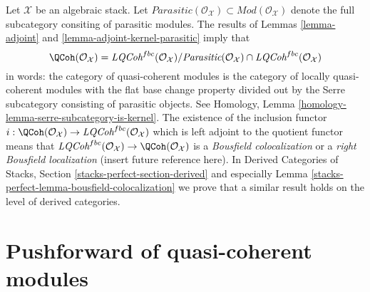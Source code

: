 \begin{remark}
\label{remark-bousfield-colocalization}
Let $\mathcal{X}$ be an algebraic stack. Let
$\textit{Parasitic}(\mathcal{O}_\mathcal{X}) \subset
\textit{Mod}(\mathcal{O}_\mathcal{X})$ denote the
full subcategory consiting of parasitic modules. The results of
Lemmas \ref{lemma-adjoint} and \ref{lemma-adjoint-kernel-parasitic}
imply that
$$
\QCoh(\mathcal{O}_\mathcal{X}) =
\textit{LQCoh}^{fbc}(\mathcal{O}_\mathcal{X}) /
\textit{Parasitic}(\mathcal{O}_\mathcal{X})
\cap \textit{LQCoh}^{fbc}(\mathcal{O}_\mathcal{X})
$$
in words: the category of quasi-coherent modules is the category
of locally quasi-coherent modules with the flat base change property
divided out by the Serre subcategory consisting of parasitic objects.
See Homology, Lemma \ref{homology-lemma-serre-subcategory-is-kernel}.
The existence of the inclusion functor
$i : \QCoh(\mathcal{O}_\mathcal{X}) \to
\textit{LQCoh}^{fbc}(\mathcal{O}_\mathcal{X})$
which is left adjoint to the quotient functor means that
$\textit{LQCoh}^{fbc}(\mathcal{O}_\mathcal{X}) \to
\QCoh(\mathcal{O}_\mathcal{X})$
is a {\it Bousfield colocalization} or a {\it right Bousfield localization}
(insert future reference here). In Derived Categories of Stacks, Section
\ref{stacks-perfect-section-derived} and especially
Lemma \ref{stacks-perfect-lemma-bousfield-colocalization}
we prove that a similar result holds on the level of derived categories.
\end{remark}












\section{Pushforward of quasi-coherent modules}
\label{section-pushforward-quasi-coherent}

